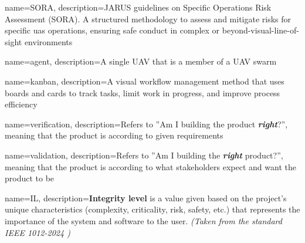 {
        name=SORA,
        description={JARUS guidelines on Specific Operations Risk Assessment (SORA). A structured methodology to assess and mitigate risks for specific \acrshort{uas} operations, ensuring safe conduct in complex or beyond-visual-line-of-sight environments}
}


{
        name=agent,
        description={A single UAV that is a member of a UAV swarm}
}

{
        name=kanban,
        description={A visual workflow management method that uses boards and cards to track tasks, limit work in progress, and improve process efficiency}
}

{
        name=verification,
        description={Refers to ''Am I building the product \textbf{\textit{right}}?'', meaning that the product is according to given requirements}
}

{
        name=validation,
        description={Refers to ''Am I building the \textbf{\textit{right}} product?'', meaning that the product is according to what stakeholders expect and want the product to be}
}

{
		name=IL,
		description={\textbf{Integrity level} is a value given based on the project's unique characteristics (complexity, criticality, risk, safety, etc.) that represents the importance of the system and software to the user. \textit{(Taken from the standard IEEE 1012-2024 \cite{1012-2024})}}
}





